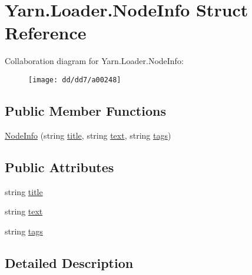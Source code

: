 \hypertarget{a00056}{\section{Yarn.\-Loader.\-Node\-Info Struct Reference}
\label{a00056}
}


Collaboration diagram for Yarn.\-Loader.\-Node\-Info\-:
\nopagebreak
\begin{figure}[H]
\begin{center}
\leavevmode
\texttt{[image: dd/dd7/a00248]}
\end{center}
\end{figure}
\subsection*{Public Member Functions}
\begin{DoxyCompactItemize}
\item 
\hyperlink{a00056_aa56085ea115b77cb9ee975686e726c29}{Node\-Info} (string \hyperlink{a00056_aafc45bbc86a9acb9bdbcf7877695a96c}{title}, string \hyperlink{a00056_a63d7ebed8095a20fc5d0d74c84a34f6c}{text}, string \hyperlink{a00056_acd4d4915f6cc14f8b0f1f92d27da8b36}{tags})
\end{DoxyCompactItemize}
\subsection*{Public Attributes}
\begin{DoxyCompactItemize}
\item 
string \hyperlink{a00056_aafc45bbc86a9acb9bdbcf7877695a96c}{title}
\item 
string \hyperlink{a00056_a63d7ebed8095a20fc5d0d74c84a34f6c}{text}
\item 
string \hyperlink{a00056_acd4d4915f6cc14f8b0f1f92d27da8b36}{tags}
\end{DoxyCompactItemize}


\subsection{Detailed Description}


